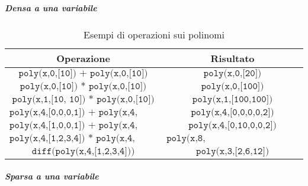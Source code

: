\documentclass[12pt,twoside]{report}
\begin{document}
\subparagraph{Densa a una variabile}

\begin{table}[h!]
\centering
\begin{tabular}{|c|c|}
\hline
\textbf{Operazione} & \textbf{Risultato} \\ \hline
$\texttt{poly(x,0,[10]) + poly(x,0,[10])}$ & $\texttt{poly(x,0,[20])}$ \\ \hline
$\texttt{poly(x,0,[10]) * poly(x,0,[10])}$ & $\texttt{poly(x,0,[100])}$ \\ \hline
$\texttt{poly(x,1,[10, 10]) * poly(x,0,[10])}$ & $\texttt{poly(x,1,[100,100])}$ \\ \hline
$\texttt{poly(x,4,[0,0,0,1]) + poly(x,4,[0,0,0,1])}$ & $\texttt{poly(x,4,[0,0,0,0,2])}$ \\ \hline
$\texttt{poly(x,4,[1,0,0,1]) + poly(x,4,[9,0,0,1])}$ & $\texttt{poly(x,4,[0,10,0,0,2])}$ \\ \hline
$\texttt{poly(x,4,[1,2,3,4]) * poly(x,4,[1,2,3,4])}$ & $\texttt{poly(x,8,[1,4,10,20,25,24,16,0,0])}$ \\ \hline
$\texttt{diff(poly(x,4,[1,2,3,4]))}$ & $\texttt{poly(x,3,[2,6,12])}$ \\ \hline
\end{tabular}
\caption{Esempi di operazioni sui polinomi}
\label{tab:operazioni-polinomi}
\end{table}

\subparagraph{Sparsa a una variabile}
\end{document}
